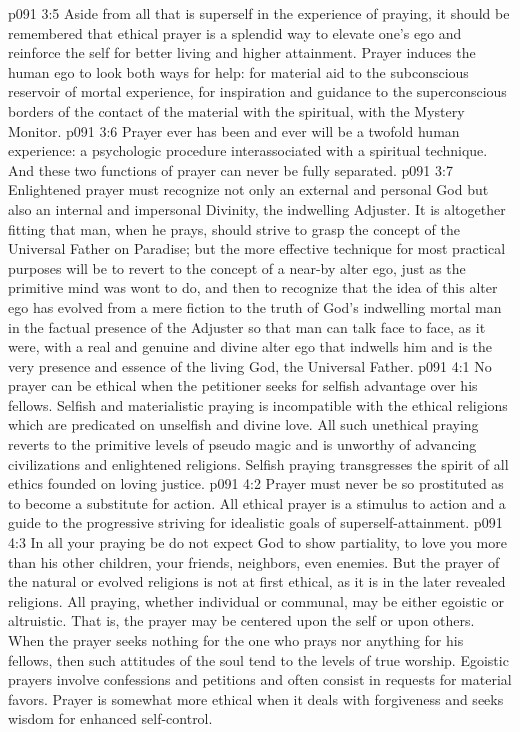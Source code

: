 \vs p091 3:5 Aside from all that is superself in the experience of praying, it should be remembered that ethical prayer is a splendid way to elevate one’s ego and reinforce the self for better living and higher attainment. Prayer induces the human ego to look both ways for help: for material aid to the subconscious reservoir of mortal experience, for inspiration and guidance to the superconscious borders of the contact of the material with the spiritual, with the Mystery Monitor.
\vs p091 3:6 Prayer ever has been and ever will be a twofold human experience: a psychologic procedure interassociated with a spiritual technique. And these two functions of prayer can never be fully separated.
\vs p091 3:7 Enlightened prayer must recognize not only an external and personal God but also an internal and impersonal Divinity, the indwelling Adjuster. It is altogether fitting that man, when he prays, should strive to grasp the concept of the Universal Father on Paradise; but the more effective technique for most practical purposes will be to revert to the concept of a near\hyp{}by alter ego, just as the primitive mind was wont to do, and then to recognize that the idea of this alter ego has evolved from a mere fiction to the truth of God’s indwelling mortal man in the factual presence of the Adjuster so that man can talk face to face, as it were, with a real and genuine and divine alter ego that indwells him and is the very presence and essence of the living God, the Universal Father.\plusone
{}%
\vs p091 4:1 No prayer can be ethical when the petitioner seeks for selfish advantage over his fellows. Selfish and materialistic praying is incompatible with the ethical religions which are predicated on unselfish and divine love. All such unethical praying reverts to the primitive levels of pseudo magic and is unworthy of advancing civilizations and enlightened religions. Selfish praying transgresses the spirit of all ethics founded on loving justice.
\vs p091 4:2 Prayer must never be so prostituted as to become a substitute for action. All ethical prayer is a stimulus to action and a guide to the progressive striving for idealistic goals of superself\hyp{}attainment.
\vs p091 4:3 In all your praying be  do not expect God to show partiality, to love you more than his other children, your friends, neighbors, even enemies. But the prayer of the natural or evolved religions is not at first ethical, as it is in the later revealed religions. All praying, whether individual or communal, may be either egoistic or altruistic. That is, the prayer may be centered upon the self or upon others. When the prayer seeks nothing for the one who prays nor anything for his fellows, then such attitudes of the soul tend to the levels of true worship. Egoistic prayers involve confessions and petitions and often consist in requests for material favors. Prayer is somewhat more ethical when it deals with forgiveness and seeks wisdom for enhanced self\hyp{}control.
